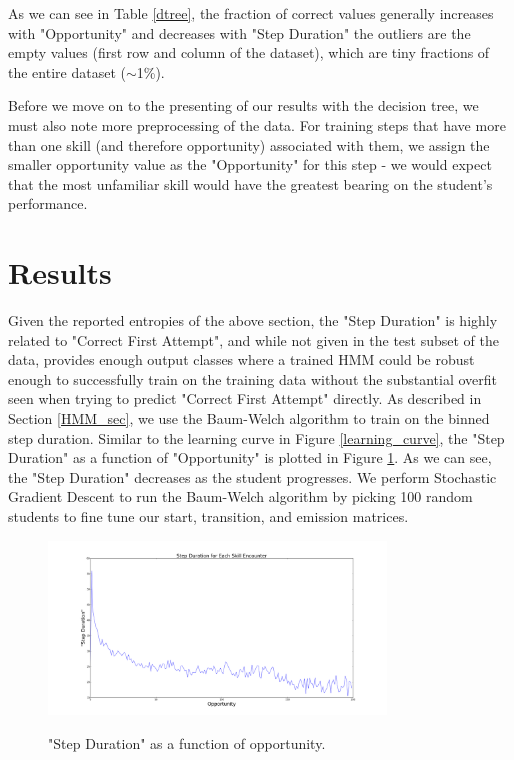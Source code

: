\documentclass{article} %
\begin{document}
As we can see in Table \ref{dtree}, the fraction of correct values generally increases with "Opportunity" and decreases with "Step Duration" the outliers are the empty values (first row and column of the dataset), which are tiny fractions of the entire dataset ($\sim$1\%).

Before we move on  to the presenting of our results with the decision tree, we must also note more preprocessing of the data. For training steps that have more than one skill (and therefore opportunity) associated with them, we assign the smaller opportunity value as the "Opportunity" for this step - we would expect that the most unfamiliar skill would have the greatest bearing on the student's performance.

\section{Results}

Given the reported entropies of the above section, the "Step Duration" is highly related to "Correct First Attempt", and while not given in the test subset of the data, provides enough output classes where a trained HMM could be robust enough to successfully train on the training data without the substantial overfit seen when trying to predict "Correct First Attempt" directly. As described in Section \ref{HMM_sec}, we use the Baum-Welch algorithm to train on the binned step duration. Similar to the learning curve in Figure \ref{learning_curve}, the "Step Duration" as a function of "Opportunity" is plotted in Figure \ref{stepdur}. As we can see, the "Step Duration" decreases as the student progresses. We perform Stochastic Gradient Descent to run the Baum-Welch algorithm by picking 100 random students to fine tune our start, transition, and emission matrices.

\begin{figure}[h]
\begin{center}
\includegraphics[width=0.8\textwidth]{stepdur_opp.png}
\label{stepdur}
\end{center}
\caption{"Step Duration" as a function of opportunity.}
\end{figure}
\end{document}
